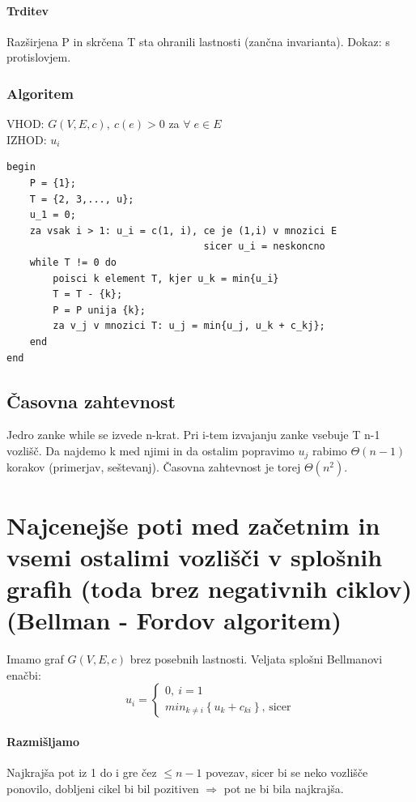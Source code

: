 \documentclass[a4paper,10pt]{article}
\begin{document}
\paragraph{Trditev}
Raz\v sirjena P in skr\v cena T sta ohranili lastnosti (zan\v cna invarianta). Dokaz: s protislovjem.

\subsubsection{Algoritem}

\begin{flushleft}
VHOD: $G(V,E,c), \: c(e) > 0$ za $\forall \; e \in E$ \\
IZHOD: $u_i$ \\
\begin{lstlisting}
begin
    P = {1};
    T = {2, 3,..., u};
    u_1 = 0;
    za vsak i > 1: u_i = c(1, i), ce je (1,i) v mnozici E
                                  sicer u_i = neskoncno
    while T != 0 do
        poisci k element T, kjer u_k = min{u_i}
        T = T - {k};
        P = P unija {k};
        za v_j v mnozici T: u_j = min{u_j, u_k + c_kj};
    end
end
\end{lstlisting}
\end{flushleft}

\subsection{\v Casovna zahtevnost}
Jedro zanke while se izvede n-krat. Pri i-tem izvajanju zanke vsebuje T n-1 vozli\v s\v c. Da najdemo k med njimi in da ostalim popravimo $u_j$ rabimo $\Theta (n-1)$ korakov (primerjav, se\v stevanj). \v Casovna zahtevnost je torej $\Theta (n^2)$.

\section{Najcenej\v se poti med za\v cetnim in vsemi ostalimi vozli\v s\v ci v splo\v snih grafih (toda brez negativnih ciklov) (Bellman - Fordov algoritem)}
Imamo graf $G(V, E, c)$ brez posebnih lastnosti. Veljata splo\v sni Bellmanovi ena\v cbi:
$$
u_i = \left\lbrace 
\begin{array}{l}
0, \: i = 1 \\
min_{k \neq i} \left\lbrace u_k + c_{ki} \right\rbrace \mbox{, sicer}
\end{array}
\right. 
$$

\paragraph{Razmi\v sljamo}
Najkraj\v sa pot iz 1 do i gre \v cez $\leq n-1$ povezav, sicer bi se neko vozli\v s\v ce ponovilo, dobljeni cikel bi bil pozitiven $\Rightarrow$ pot ne bi bila najkraj\v sa.
\end{document}
